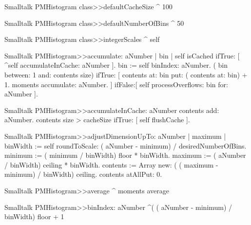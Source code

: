 \begin{displaycode}{Smalltalk}
PMHistogram class>>defaultCacheSize
    ^ 100
\end{displaycode}
  
\begin{displaycode}{Smalltalk}
PMHistogram class>>defaultNumberOfBins
^ 50
\end{displaycode}

\begin{displaycode}{Smalltalk}
PMHistogram class>>integerScales
   ^ self
\end{displaycode}

\begin{displaycode}{Smalltalk}
PMHistogram>>accumulate: aNumber
    | bin |
    self isCached
        ifTrue: [ ^self accumulateInCache: aNumber ].
    bin := self binIndex: aNumber.
    ( bin between: 1 and: contents size)
        ifTrue: [ contents at: bin put: ( contents at: bin) + 1.
                     moments accumulate: aNumber.
                   ]
        ifFalse:[ self processOverflows: bin for: aNumber ].
\end{displaycode}

\begin{displaycode}{Smalltalk}
PMHistogram>>accumulateInCache: aNumber
    contents add: aNumber.
    contents size > cacheSize
        ifTrue: [ self flushCache ].
\end{displaycode}
        
\begin{displaycode}{Smalltalk}
PMHistogram>>adjustDimensionUpTo: aNumber
    | maximum |
    binWidth := self roundToScale: ( aNumber - minimum) / 
                                                  desiredNumberOfBins.
    minimum := ( minimum / binWidth) floor * binWidth.
    maximum := ( aNumber / binWidth) ceiling * binWidth.
    contents := Array new: ( ( maximum - minimum) / binWidth) 
                                                              ceiling.
    contents atAllPut: 0.
\end{displaycode}
  
\begin{displaycode}{Smalltalk}
PMHistogram>>average
    ^ moments average
\end{displaycode}
  
\begin{displaycode}{Smalltalk}
PMHistogram>>binIndex: aNumber
    ^( ( aNumber - minimum) / binWidth) floor + 1
\end{displaycode}
  
